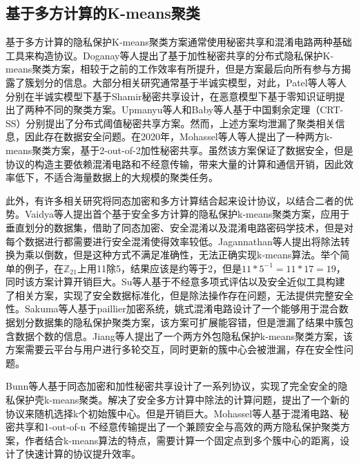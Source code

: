 \subsection{基于多方计算的K-means聚类}
基于多方计算的隐私保护K-means聚类方案通常使用秘密共享和混淆电路两种基础工具来构造协议。Doganay等人\cite{doganay2008distributed}提出了基于加性秘密共享的分布式隐私保护K-means聚类方案，相较于之前的工作效率有所提升，但是方案最后向所有参与方揭露了簇划分的信息。大部分相关研究通常基于半诚实模型，对此，Patel等人\cite{patel2012efficient}\cite{patel2013privacy}等人分别在半诚实模型下基于Shamir秘密共享设计，在恶意模型下基于零知识证明提出了两种不同的聚类方案。Upmanyu等人\cite{upmanyu2010efficient}和Baby等人\cite{baby2016distributed}基于中国剩余定理（CRT-SS）分别提出了分布式阈值秘密共享方案。然而，上述方案均泄漏了聚类相关信息，因此存在数据安全问题\cite{hegde2021sok}。在2020年，Mohassel等人\cite{mohassel2019practical}等人提出了一种两方k-means聚类方案，基于2-out-of-2加性秘密共享。虽然该方案保证了数据安全，但是协议的构造主要依赖混淆电路和不经意传输，带来大量的计算和通信开销，因此效率低下，不适合海量数据上的大规模的聚类任务。

此外，有许多相关研究将同态加密和多方计算结合起来设计协议，以结合二者的优势。Vaidya等人\cite{vaidya2003privacy}提出首个基于安全多方计算的隐私保护k-means聚类方案\cite{meskine2012privacy}，应用于垂直划分的数据集，借助了同态加密、安全混淆\cite{du2001privacy}以及混淆电路密码学技术，但是对每个数据进行都需要进行安全混淆使得效率较低。Jagannathan等人\cite{jagannathan2005privacy}提出将除法转换为乘以倒数，但是这种方式不满足准确性，无法正确实现k-means算法。举个简单的例子，在$\mathbb{Z}_{21}$上用11除5，结果应该是约等于2，但是$11*5^{-1}=11*17=19$，同时该方案计算开销巨大\cite{bunn2007secure}。Su等人\cite{su2007privacy}基于不经意多项式评估以及安全近似工具构建了相关方案，实现了安全数据标准化，但是除法操作存在问题，无法提供完整安全性。Sakuma等人\cite{sakuma2010large}基于paillier加密系统，姚式混淆电路设计了一个能够用于混合数据划分数据集的隐私保护聚类方案，该方案可扩展能容错，但是泄漏了结果中簇包含数据个数的信息。Jiang等人\cite{jiang2020efficient}提出了一个两方外包隐私保护k-means聚类方案，该方案需要云平台与用户进行多轮交互，同时更新的簇中心会被泄漏，存在安全性问题。

Bunn等人\cite{bunn2007secure}基于同态加密和加性秘密共享设计了一系列协议，实现了完全安全的隐私保护壳k-means聚类。解决了安全多方计算中除法的计算问题，提出了一个新的协议来随机选择k个初始簇中心。但是开销巨大。Mohassel等人\cite{mohassel2019practical}基于混淆电路、秘密共享和1-out-of-n 不经意传输提出了一个兼顾安全与高效的两方隐私保护聚类方案，作者结合k-means算法的特点，需要计算一个固定点到多个簇中心的距离，设计了快速计算的协议提升效率。

